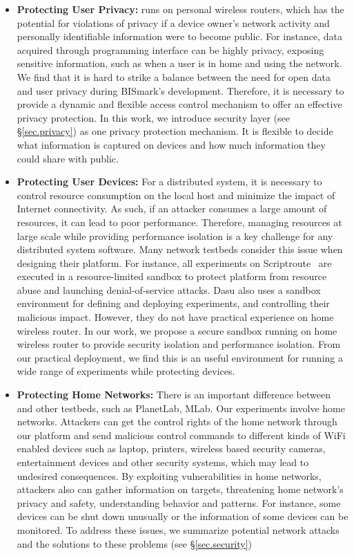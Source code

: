 \begin{itemize}
\item \textbf{Protecting User Privacy:} \sysname runs on personal wireless routers, which has the potential for violations of privacy if a device owner's network activity and personally identifiable information were to become public. For instance, data acquired through programming interface can be highly privacy, exposing sensitive information, such as when a user is in home and using the network. We find that it is hard to strike a balance between the need for open data and user privacy during BISmark's development. Therefore, it is necessary to provide a dynamic and flexible access control mechanism to offer an effective privacy protection. In this work, we introduce security layer (see \S{\ref{sec.privacy}}) as one privacy protection mechanism. It is flexible to decide what information is captured on devices and how much information they could share with public. 

\item \textbf{Protecting User Devices:} For a distributed system, it is necessary to control resource consumption on the local host and minimize the impact of Internet connectivity. As such, if an attacker consumes a large amount of resources, it can lead to poor performance. Therefore, managing resources at large scale while providing performance isolation is a key challenge for any distributed system software. Many network testbeds consider this issue when designing their platform. For instance, all experiments on Scriptroute~\cite{spring2003scriptroute} are executed in a resource-limited sandbox to protect platform from resource abuse and launching denial-of-service attacks. Dasu also uses a sandbox environment for defining and deploying experiments, and controlling their malicious impact. However, they do not have practical experience on home wireless router. In our work, we propose a secure sandbox running on home wireless router to provide security isolation and performance isolation. From our practical deployment, we find this is an useful environment for running a wide range of experiments while protecting devices.

\item \textbf{Protecting Home Networks:} There is an important difference between \sysname and other testbeds, such as PlanetLab, MLab. Our experiments involve home networks. Attackers can get the control rights of the home network through our platform and send malicious control commands to different kinds of WiFi enabled devices such as laptop, printers, wireless based security cameras, entertainment devices and other security systems, which may lead to undesired consequences. By exploiting vulnerabilities in home networks, attackers also can gather information on targets, threatening home network's privacy and safety, understanding behavior and patterns. For instance, some devices can be shut down unusually or the information of some devices can be monitored. To address these issues, we summarize potential network attacks and the solutions to these problems (see \S{\ref{sec.security}})
\end{itemize}

